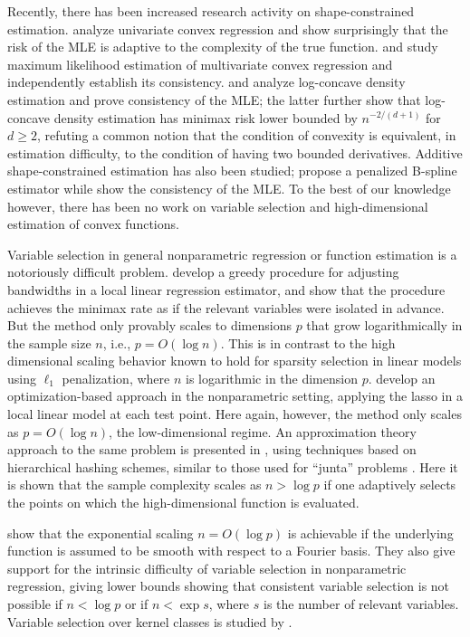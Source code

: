 Recently, there has been increased research activity on shape-constrained estimation. \cite{guntusen:13} analyze univariate convex regression and show surprisingly that the risk of the MLE is adaptive to the complexity of the true function. \cite{seijo2011nonparametric} and \cite{Lim:12} study maximum likelihood estimation of multivariate convex regression and independently establish its consistency. \cite{Cule:10} and \cite{kim2014global} analyze log-concave density estimation and prove consistency of the MLE; the latter further show that log-concave density estimation has minimax risk lower bounded by $n^{-2/(d+1)}$ for $d \geq 2$, refuting a common notion that the condition of convexity is equivalent, in estimation difficulty, to the condition of having two bounded derivatives. Additive shape-constrained estimation has also been studied; \cite{pya2014shape} propose a penalized B-spline estimator while \cite{chen2014generalised} show the consistency of the MLE. To the best of our knowledge however, there has been no work on variable selection and high-dimensional estimation of convex functions.


Variable selection in general nonparametric regression or function
estimation is a notoriously difficult problem. \citet{lafferty2008rodeo} develop a greedy procedure for
adjusting bandwidths in a local linear regression estimator,
and show that the procedure achieves the minimax rate
as if the relevant variables were isolated in advance.
But the method only provably scales to dimensions $p$ that 
grow logarithmically in the sample size $n$, i.e., $p = O(\log n)$.  This
is in contrast to the high dimensional scaling behavior
known to hold for sparsity selection in linear models
using $\ell_1$ penalization, where $n$
is logarithmic in the dimension $p$. \citet{bertin:08}
develop an optimization-based approach in
the nonparametric setting, applying the lasso
in a local linear model at each test point.  Here again,
however, the method only scales as $p = O(\log n)$,
the low-dimensional regime.
An approximation theory approach to the same
problem is presented in \cite{devore:11}, 
using techniques based on hierarchical hashing schemes,
similar to those used for ``junta'' problems \citep{mossel:04}.
Here it is shown that the sample complexity scales as $n > \log p$ 
if one adaptively selects the points on
which the high-dimensional function is evaluated.

\citet{dalalyan:12} show that the exponential scaling $n=O(\log p)$ is
achievable if the underlying function is assumed to be smooth with
respect to a Fourier basis. They also give support for the intrinsic
difficulty of variable selection in nonparametric regression, giving
lower bounds showing that consistent variable selection is not
possible if $n < \log p$ or if $n < \exp s$, where $s$ is the number
of relevant variables.  Variable selection over kernel classes is
studied by \citet{Kolch:10}.

